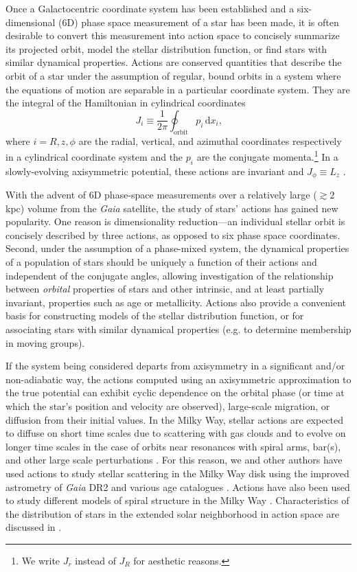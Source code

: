 \documentclass[twocolumn]{aastex62}
\newcommand{\beq}{\begin{equation}}
\newcommand{\eeq}{\end{equation}}
\begin{document}
Once a Galactocentric coordinate system has been established and a
six-dimensional (6D) phase
space measurement of a star has been made, it is often desirable to convert
this measurement into action space to concisely summarize its projected orbit,
model the stellar distribution function, or find stars with similar dynamical
properties. Actions are conserved quantities that describe the orbit of a
star under the assumption of regular, bound orbits in a system where the
equations of motion are separable in a particular coordinate system. They are
the 
integral of the Hamiltonian in cylindrical coordinates 
\beq\label{eq:actions}
J_i \equiv
\frac{1}{2\pi} \oint_{\text{orbit}}p_i\,\text{d}x_i\text{,}
\eeq
where $i=R,z,\phi$ are the radial, vertical, and azimuthal coordinates
respectively in a cylindrical coordinate system and the $p_i$ are the
conjugate momenta.\footnote{We 
write $J_r$ instead of $J_R$ for
aesthetic reasons.} In a slowly-evolving axisymmetric potential, these actions
are invariant and $J_{\phi} \equiv L_z$
\citep{2008gady.book.....B,2014RvMP...86....1S}.

With the advent of 6D phase-space measurements over a relatively large
($\gtrsim 2$ kpc) volume from the {\em Gaia} satellite, the study of stars'
actions has gained new popularity. One reason is dimensionality reduction---an
individual stellar orbit is concisely described by three actions, as opposed
to six phase space coordinates. Second, under the assumption of a
phase-mixed system, the dynamical properties of a population of stars should
be uniquely a function of their actions and independent of the conjugate
angles, allowing investigation of the relationship between {\em orbital}
properties of stars and other intrinsic, and at least partially invariant,
properties such as age or metallicity. Actions also provide a convenient basis
for constructing models of the stellar distribution function, or for
associating stars with similar dynamical properties (e.g. to determine
membership in moving groups).

If the system being considered departs from axisymmetry in a significant
and/or non-adiabatic way, the actions computed using an axisymmetric
approximation to the true potential can exhibit cyclic dependence on the
orbital phase (or time at which the star's position and velocity are
observed), large-scale migration, or diffusion from their initial values. In
the Milky Way, stellar actions are expected to diffuse on short time scales
due to scattering with gas clouds and to evolve on longer time scales in the
case of orbits near resonances with spiral arms, bar(s), and other large scale
perturbations \citep{2014RvMP...86....1S}. For this reason, we and other
authors have used actions to study stellar scattering in the Milky Way disk
using the improved astrometry of {\em Gaia} DR2 and various age catalogues
\citep{2018ApJ...867...31B,2018arXiv180803278T}. Actions have also been used
to study different models of spiral structure in the Milky Way
\citep{2019MNRAS.tmp..155S}. Characteristics of the distribution of stars in
the extended solar neighborhood in action space are discussed in
\citet{2019MNRAS.484.3291T}.
\end{document}
